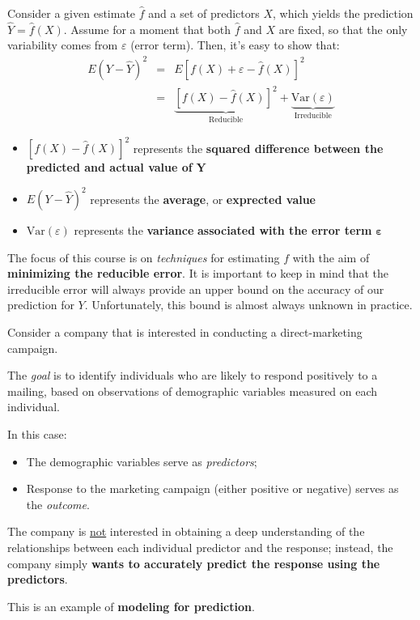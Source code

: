 \documentclass[a4paper]{article}
\newcommand{\definition}[1]{\textcolor{Red3}{\textbf{#1}}\index{#1}}
\newcommand{\Var}{\mathrm{Var}}
\begin{document}
    \noindent
    Consider a given estimate $\hat{f}$ and a set of predictors $X$, which yields the prediction $\hat{Y} = \hat{f}\left(X\right)$. Assume for a moment that both $\hat{f}$ and $X$ are fixed, so that the only variability comes from $\varepsilon$ (error term). Then, it's easy to show that:
    \begin{equation}
        \begin{array}{rcl}
            E\left(Y - \hat{Y}\right)^{2} &=& E\left[f\left(X\right) + \varepsilon - \hat{f}\left(X\right)\right]^{2} \\ [1em]
                                          &=& \underbrace{\left[f\left(X\right) - \hat{f}\left(X\right)\right]^{2}}_{\text{Reducible}} + \underbrace{\Var\left(\varepsilon\right)}_{\text{Irreducible}}
        \end{array}
    \end{equation}
    \begin{itemize}
        \item $\left[f\left(X\right) - \hat{f}\left(X\right)\right]^{2}$ represents the \textbf{squared difference between the predicted and actual value of} $\bm{Y}$
        
        \item $E\left(Y-\hat{Y}\right)^{2}$ represents the \textbf{average}, or \definition{exprected value}
        
        \item $\Var\left(\varepsilon\right)$ represents the \definition{variance} \textbf{associated with the error term} $\bm{\varepsilon}$
    \end{itemize}
    The focus of this course is on \emph{techniques} for estimating $f$ with the aim of \textbf{minimizing the reducible error}. It is important to keep in mind that the irreducible error will always provide an upper bound on the accuracy of our prediction for $Y$. Unfortunately, this bound is almost always unknown in practice.

    \begin{examplebox}
        Consider a company that is interested in conducting a direct-marketing campaign.

        The \emph{goal} is to identify individuals who are likely to respond positively to a mailing, based on observations of demographic variables measured on each individual.

        In this case:
        \begin{itemize}
            \item The demographic variables serve as \emph{predictors};
            \item Response to the marketing campaign (either positive or negative) serves as the \emph{outcome}.
        \end{itemize}
        The company is \underline{not} interested in obtaining a deep understanding of the relationships between each individual predictor and the response; instead, the company simply \textbf{wants to accurately predict the response using the predictors}.

        This is an example of \textbf{modeling for prediction}.
    \end{examplebox}
\end{document}
